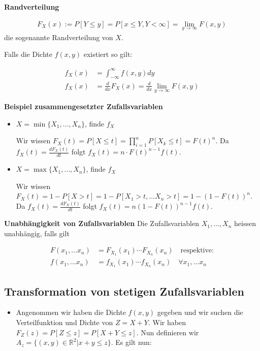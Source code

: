 \documentclass[25pt]{sciposter}
\newcommand{\R}{\mathbb{R}}
\newenvironment{method}[1]{\begin{mdframed}[backgroundcolor=blue!10,innertopmargin=15pt, innerbottommargin=15pt,nobreak=true]
		\textbf{#1 }
	}
	{ 
	\end{mdframed}
}
\begin{document}
\begin{multicols}{3}
\begin{method}{Randverteilung}
	\begin{align*}
	F_X(x) := P[Y \leq y] = P[x\leq Y, Y < \infty] = \lim_{y \to \infty} F(x,y)
	\end{align*}
	die sogenannte Randverteilung von $X$.
	
	Falls die Dichte $f(x,y)$ existiert so gilt:
	
	\begin{align*}
	f_X(x) &= \int_{-\infty}^{\infty}f(x,y) dy\\
	f_X(x) &= \frac{d}{dx}F_X(x) = \frac{d}{dx}\lim_{y \to \infty} F(x,y)
	\end{align*}
	
\end{method}

\textbf{Beispiel zusammengesetzter Zufallsvariablen}

\begin{itemize}
	\item $X = \min\{X_1,\ldots,X_n\}$, finde $f_X$
	
	Wir wissen $F_X(t) = P[X\leq t] = \prod_{i=1}^n P[X_k \leq t] = F(t)^n$. Da $f_X(t) = \frac{dF_X(t)}{dt}$ folgt $f_X(t) = n\cdot F(t)^{n-1} f(t)$.
	
	\item $X = \max\{X_1,\ldots,X_n\}$, finde $f_X$
	
	Wir wissen $F_X(t) = 1 - P[X>t] = 1 - P [X_1 > t, \ldots X_n > t] = 1 - (1 - F(t))^n$. Da $f_X(t) = \frac{dF_X(t)}{dt}$ folgt $f_X(t) = n(1-F(t))^{n-1}f(t)$.
\end{itemize}




\begin{method}{Unabhängigkeit von Zufallsvariablen} Die Zufallsvariablen $X_1,\ldots, X_n$ heissen unabhängig, falls gilt
	
	\begin{align*}
	F(x_1,\ldots x_n) &= F_{X_1}(x_1) \cdots F_{X_n}(x_n) \quad \text{respektive:}\\
	f(x_1,\ldots x_n) &= f_{X_1}(x_1) \cdots f_{X_n}(x_n) \quad \forall x_1,\ldots x_n
	\end{align*}
\end{method}


\subsection*{Transformation von stetigen Zufallsvariablen}
\begin{itemize}
	\item Angenommen wir haben die Dichte $f(x,y)$ gegeben und wir suchen die Verteilfunktion und Dichte von $Z = X + Y$. Wir haben $F_Z(z) = P[Z \leq z] = P[X+Y\leq z]$. Nun definieren wir $A_z = \{(x,y)\in\R^2|x+y\leq z\}$. Es gilt nun:
	

\end{itemize}
\end{multicols}
\end{document}
